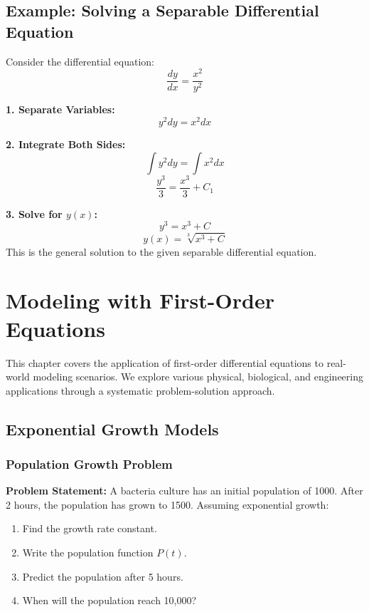 \documentclass[12pt, letterpaper]{book}
\begin{document}
\section{Example: Solving a Separable Differential Equation}
Consider the differential equation:
\begin{equation*}
    \frac{dy}{dx} = \frac{x^2}{y^2}
\end{equation*}

\textbf{1. Separate Variables:}
\begin{equation*}
    y^2 dy = x^2 dx
\end{equation*}

\textbf{2. Integrate Both Sides:}
\begin{equation*}
    \int y^2 dy = \int x^2 dx
\end{equation*}
\begin{equation*}
    \frac{y^3}{3} = \frac{x^3}{3} + C_1
\end{equation*}

\textbf{3. Solve for $y(x)$:}
\begin{equation*}
    y^3 = x^3 + C
\end{equation*}
\begin{equation*}
    y(x) = \sqrt[3]{x^3 + C}
\end{equation*}
This is the general solution to the given separable differential equation.

\chapter{Modeling with First-Order Equations}
\label{chap:session_3}

This chapter covers the application of first-order differential equations to real-world modeling scenarios. We explore various physical, biological, and engineering applications through a systematic problem-solution approach.

\section{Exponential Growth Models}

\subsection{Population Growth Problem}
\textbf{Problem Statement:}
A bacteria culture has an initial population of 1000. After 2 hours, the population has grown to 1500. Assuming exponential growth:
\begin{enumerate}
    \item Find the growth rate constant.
    \item Write the population function $P(t)$.
    \item Predict the population after 5 hours.
    \item When will the population reach 10,000?
\end{enumerate}
\end{document}
